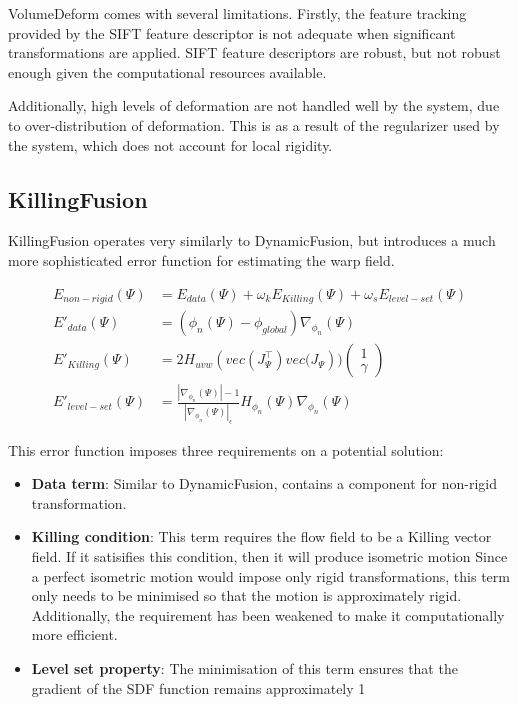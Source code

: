 \documentclass[a4paper]{article}
\begin{document}
VolumeDeform comes with several limitations. Firstly, the feature tracking provided by the SIFT feature descriptor is not adequate when significant transformations are applied. SIFT feature descriptors are robust, but not robust enough given the computational resources available.

Additionally, high levels of deformation are not handled well by the system, due to over-distribution of deformation. This is as a result of the regularizer used by the system, which does not account for local rigidity.


\subsection{KillingFusion}

KillingFusion\cite{killingfusion} operates very similarly to DynamicFusion, but introduces a much more sophisticated error function for estimating the warp field.

\begin{align*}
E_{non-rigid}(\Psi) &= E_{data}(\Psi) + \omega_kE_{Killing}(\Psi) + \omega_sE_{level-set}(\Psi)\\
E'_{data}(\Psi) &= (\phi_n(\Psi) - \phi_{global}) \nabla_{\phi_n}(\Psi)\\
E'_{Killing}(\Psi) &= 2H_{uvw}(vec(J^{\top}_{\Psi}) vec\big(J_{\Psi})\big)\begin{pmatrix}1\\\gamma \end{pmatrix}\\
E'_{level-set}(\Psi) &= \frac{|\nabla_{\phi_n}(\Psi)| - 1}{|\nabla_{\phi_n}(\Psi)|_\epsilon}H_{\phi_n}(\Psi)\nabla_{\phi_n}(\Psi)
\end{align*}

This error function imposes three requirements on a potential solution:
\begin{itemize}
\item \textbf{Data term}: Similar to DynamicFusion, contains a component for non-rigid transformation. 
\item \textbf{Killing condition}: This term requires the flow field to be a Killing vector field. If it satisifies this condition, then it will produce isometric motion Since a perfect isometric motion would impose only rigid transformations, this term only needs to be minimised so that the motion is approximately rigid. Additionally, the requirement has been weakened to make it computationally more efficient.
\item \textbf{Level set property}: The minimisation of this term ensures that the gradient of the SDF function remains approximately 1
\end{itemize}
\end{document}
